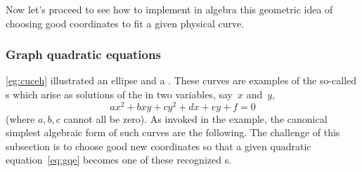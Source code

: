 Now let's proceed to see how to implement in algebra this geometric idea of choosing good coordinates to fit a given physical curve. 


\subsubsection{Graph quadratic equations}
\label{sec:gqe}

\autoref{eg:cuceh} illustrated an ellipse and a .  These curves are examples of the so-called s which arise as solutions of the  in two variables, say~\(x\) and~\(y\),
\begin{equation}
ax^2+bxy+cy^2+dx+ey+f=0 \label{eq:gqe}
\end{equation}
(where \(a,b,c\) cannot all be zero).
As invoked in the example, the canonical simplest algebraic form of such curves are the following.
The challenge of this subsection is to choose good new coordinates so that a given quadratic equation~\eqref{eq:gqe} becomes one of these recognized s.
